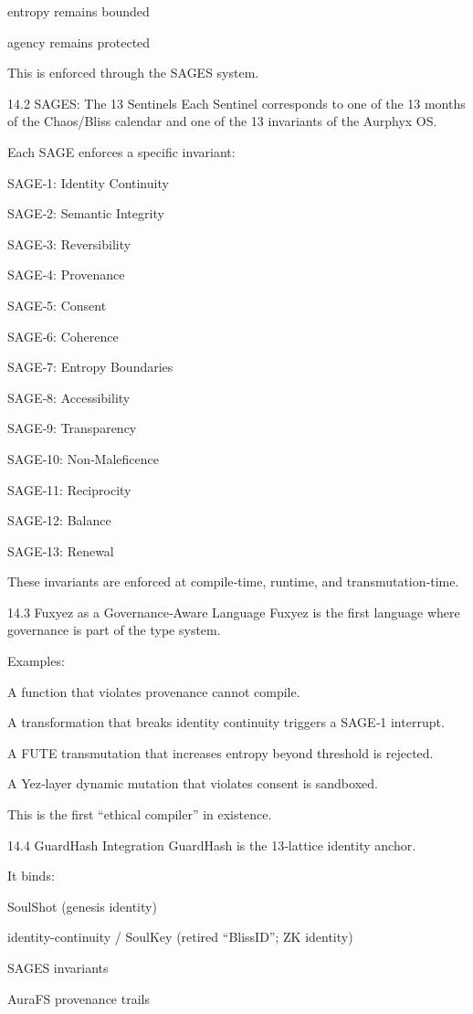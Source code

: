 \begin{enumerate}
entropy remains bounded

agency remains protected

This is enforced through the SAGES system.

14.2 SAGES: The 13 Sentinels
Each Sentinel corresponds to one of the 13 months of the Chaos/Bliss calendar and one of the 13 invariants of the Aurphyx OS.

Each SAGE enforces a specific invariant:

SAGE‑1: Identity Continuity

SAGE‑2: Semantic Integrity

SAGE‑3: Reversibility

SAGE‑4: Provenance

SAGE‑5: Consent

SAGE‑6: Coherence

SAGE‑7: Entropy Boundaries

SAGE‑8: Accessibility

SAGE‑9: Transparency

SAGE‑10: Non‑Maleficence

SAGE‑11: Reciprocity

SAGE‑12: Balance

SAGE‑13: Renewal

These invariants are enforced at compile‑time, runtime, and transmutation‑time.

14.3 Fuxyez as a Governance‑Aware Language
Fuxyez is the first language where governance is part of the type system.

Examples:

A function that violates provenance cannot compile.

A transformation that breaks identity continuity triggers a SAGE‑1 interrupt.

A FUTE transmutation that increases entropy beyond threshold is rejected.

A Yez‑layer dynamic mutation that violates consent is sandboxed.

This is the first “ethical compiler” in existence.

14.4 GuardHash Integration
GuardHash is the 13‑lattice identity anchor.

It binds:

SoulShot (genesis identity)

identity-continuity / SoulKey (retired ``BlissID''; ZK identity)

SAGES invariants

AuraFS provenance trails


\end{enumerate}
